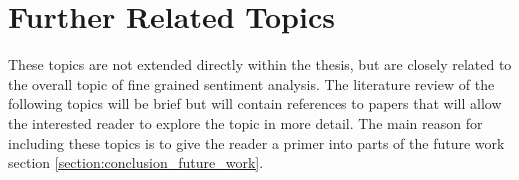 






\section{Further Related Topics}
These topics are not extended directly within the thesis, but are closely related to the overall topic of fine grained sentiment analysis. The literature review of the following topics will be brief but will contain references to papers that will allow the interested reader to explore the topic in more detail. The main reason for including these topics is to give the reader a primer into parts of the future work section \ref{section:conclusion_future_work}.


